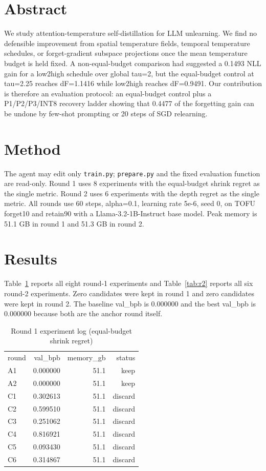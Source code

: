 \documentclass{article}
\begin{document}
\section{Abstract}
We study attention-temperature self-distillation for LLM unlearning.
We find no defensible improvement from spatial temperature fields, temporal
temperature schedules, or forget-gradient subspace projections once the mean
temperature budget is held fixed. A non-equal-budget comparison had suggested
a 0.1493 NLL gain for a low2high schedule over global tau=2, but the equal-budget
control at tau=2.25 reaches dF=1.1416 while low2high reaches dF=0.9491.
Our contribution is therefore an evaluation protocol: an equal-budget control
plus a P1/P2/P3/INT8 recovery ladder showing that 0.4477 of the forgetting gain
can be undone by few-shot prompting or 20 steps of SGD relearning.

\section{Method}
The agent may edit only \texttt{train.py}; \texttt{prepare.py} and the fixed
evaluation function are read-only. Round 1 uses 8 experiments with the
equal-budget shrink regret as the single metric. Round 2 uses 6 experiments
with the depth regret as the single metric. All rounds use 60 steps,
alpha=0.1, learning rate 5e-6, seed 0, on TOFU forget10 and retain90 with a
Llama-3.2-1B-Instruct base model. Peak memory is 51.1 GB in round 1 and
51.3 GB in round 2.

\section{Results}
Table~\ref{tab:r1} reports all eight round-1 experiments and Table~\ref{tab:r2}
reports all six round-2 experiments. Zero candidates were kept in round 1 and
zero candidates were kept in round 2. The baseline val_bpb is 0.000000 and the
best val_bpb is 0.000000 because both are the anchor round itself.

\begin{table}[h]
\caption{Round 1 experiment log (equal-budget shrink regret)}
\label{tab:r1}
\begin{tabular}{lrrr}
round & val\_bpb & memory\_gb & status \\
A1 & 0.000000 & 51.1 & keep \\
A2 & 0.000000 & 51.1 & keep \\
C1 & 0.302613 & 51.1 & discard \\
C2 & 0.599510 & 51.1 & discard \\
C3 & 0.251062 & 51.1 & discard \\
C4 & 0.816921 & 51.1 & discard \\
C5 & 0.093430 & 51.1 & discard \\
C6 & 0.314867 & 51.1 & discard \\
\end{tabular}
\end{table}
\end{document}
